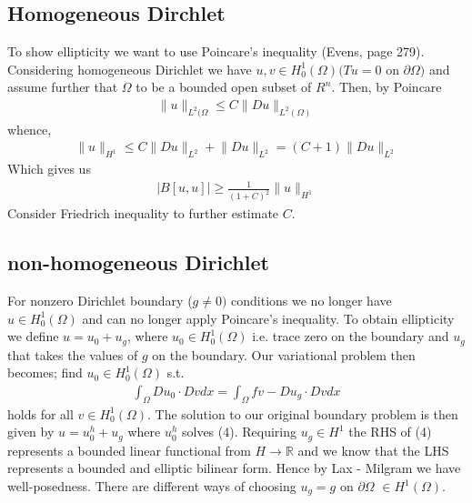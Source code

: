 \documentclass[11pt, norsk, a4paper]{article}
\newcommand\norm[1]{\lVert#1\rVert}
\begin{document}
\subsection*{Homogeneous Dirchlet}
To show ellipticity we want to use Poincare's inequality (Evens, page 279). Considering homogeneous Dirichlet we have $u,v \in H^1_0(\Omega) (Tu = 0$ on $\partial \Omega)$ and assume further that $\Omega$ to be a bounded open subset of $R^n$. Then, by Poincare 
\begin{align*}
    \norm{u}_{L^2(\Omega} \leq C\norm{Du}_{L^2(\Omega)} 
\end{align*}
whence, 
\begin{align*}
    \norm{u}_{H^1} \leq C\norm{Du}_{L^2}+\norm{Du}_{L^2} = (C+1)\norm{Du}_{L^2}
\end{align*}
Which gives us 
\begin{align*}
    |B[u,u]| \geq \frac{1}{(1+C)^2} \norm{u}_{H^1}
\end{align*}
Consider Friedrich inequality to further estimate $C$.

\subsection*{non-homogeneous Dirichlet}
For nonzero Dirichlet boundary ($g \neq 0)$ conditions we no longer have $u \in H_0^1(\Omega)$ and can no longer apply Poincare's inequality. To obtain ellipticity we define $u = u_0 + u_g$, where $u_0 \in H^1_0(\Omega)$ i.e. trace zero on the boundary and $u_g$ that takes the values of $g$ on the boundary. Our variational problem then becomes; find $u_0 \in H^1_0(\Omega) $ s.t. 
\begin{align}
    \int_{\Omega} Du_0\cdot Dv dx = \int_{\Omega} fv -Du_g\cdot Dv dx 
\end{align}
holds for all $v\in H^1_0(\Omega)$. The solution to our original boundary problem is then given by $u = u^h_0+u_g$ where $u^h_0$ solves (4). Requiring $u_g \in H^1$ the RHS of (4) represents a bounded linear functional from $H \to \mathbb{R}$ and we know that the LHS represents a bounded and elliptic bilinear form. Hence by Lax - Milgram we have well-posedness. There are different ways of choosing $u_g = g$ on $\partial \Omega$ $\in H^1(\Omega)$. \cite{Master}
\end{document}
